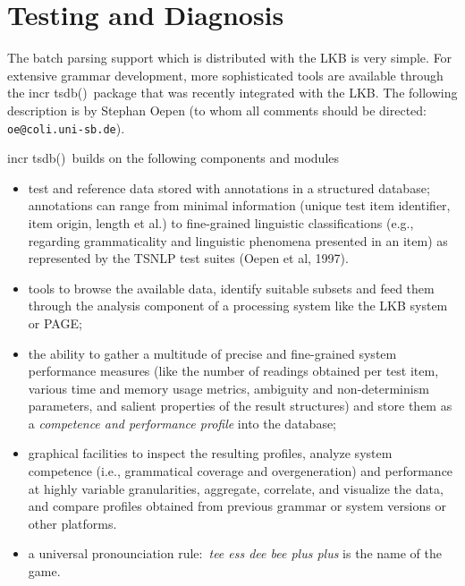 \documentclass[12pt]{report}
\newcommand{\itsdb}{{\sf \lbrack incr tsdb()\rbrack}}
\begin{document}

\section{Testing and Diagnosis}
\label{tsdb}

The batch parsing support which is distributed with the
LKB is very simple.  For extensive grammar development,
more sophisticated tools
are available through the \itsdb\ package that was recently
integrated with the LKB.  The following description is by Stephan Oepen
(to whom all comments should be directed: {\tt oe@coli.uni-sb.de}).

\itsdb\ builds on the following components and modules
\begin{itemize}

\item test and reference data stored with annotations in a structured database;
annotations can range from minimal information (unique test item
identifier, item origin, length et al.) to fine-grained linguistic
classifications (e.g., regarding grammaticality and linguistic
phenomena presented in an item) as represented by the TSNLP test
suites (Oepen et al, 1997).

\item tools to browse the available data, identify suitable subsets and feed
them through the analysis component of a processing system like
the LKB system or PAGE;

\item the ability to gather a multitude of precise and fine-grained system
performance measures (like the number of readings obtained per test
item, various time and memory usage metrics, ambiguity and
non-determinism parameters, and salient properties of the result
structures) and store them as a {\em competence and performance
profile\/} into the database;

\item graphical facilities to inspect the resulting profiles, analyze
system competence (i.e., grammatical coverage and
overgeneration) and performance at highly variable
granularities, aggregate, correlate, and visualize the data,
and compare profiles obtained from previous grammar or system
versions or other platforms.

\item a universal pronounciation rule:\ {\em tee ess dee bee plus 
plus\/} is the name of the game.
\end{itemize}
\end{document}
